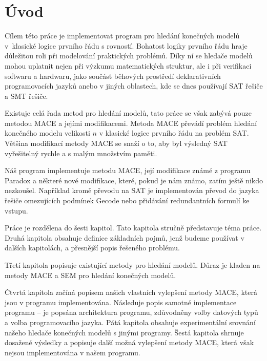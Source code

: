 \chapter{Úvod}

Cílem této práce je implementovat program pro hledání konečných
modelů v~klasické logice prvního řádu s rovností.
Bohatost logiky prvního řádu hraje důležitou roli při modelování
praktických problémů.
Díky ní se hledače modelů mohou uplatnit nejen při výzkumu
matematických struktur, ale i při verifikaci softwaru a hardwaru,
jako součást běhových prostředí deklarativních programovacích jazyků
anebo v jiných oblastech, kde se dnes používají SAT řešiče a SMT řešiče.

Existuje celá řada metod pro hledání modelů, tato práce se však
zabývá pouze metodou MACE a jejími modifikacemi.
Metoda MACE převádí problém hledání
konečného modelu velikosti $n$ v klasické logice prvního řádu
na problém SAT. Většina modifikací metody MACE se snaží o to, aby
byl výsledný SAT vyřešitelný rychle a s malým množstvím paměti.

Náš program implementuje metodu MACE, její modifikace známé
z programu Paradox a některé nové modifikace,
které, pokud je nám známo, zatím ještě nikdo nezkoušel.
Například kromě převodu na SAT je implementován
převod do jazyka řešiče omezujících podmínek Gecode
nebo přidávání redundantních formulí ke vstupu.

Práce je rozdělena do šesti kapitol. Tato kapitola
stručně představuje téma práce.
Druhá kapitola obsahuje definice základních pojmů,
jenž budeme používat v dalších kapitolách,
a přesnější popis řešeného problému.

Třetí kapitola popisuje existující metody pro hledání modelů.
Důraz je kladen na metody MACE a SEM pro hledání konečných modelů.

Čtvrtá kapitola začíná popisem našich vlastních vylepšení metody MACE,
která jsou v programu implementována.
Následuje popis samotné implementace programu -- je popsána architektura
programu, zdůvodněny volby datových typů a volba programovacího jazyka.
Pátá kapitola obsahuje experimentální srovnání našeho hledače konečných modelů
s jinými programy.
Šestá kapitola shrnuje dosažené výsledky a popisuje další možná vylepšení
metody MACE, která však nejsou implementována v našem programu.

